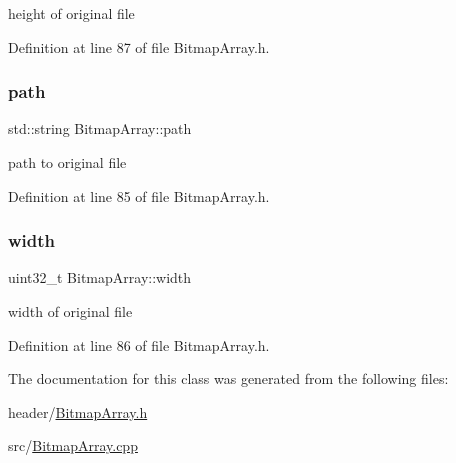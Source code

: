 height of original file 

Definition at line 87 of file Bitmap\+Array.\+h.

\mbox{\label{classBitmapArray_a3a3e1fbdd198c6731c7f6e20fb492445}} 
\subsubsection{\texorpdfstring{path}{path}}
{\footnotesize\ttfamily std\+::string Bitmap\+Array\+::path\hspace{0.3cm}{\ttfamily [private]}}

path to original file 

Definition at line 85 of file Bitmap\+Array.\+h.

\mbox{\label{classBitmapArray_a44f51b2c1ecde3f9aa504df25d65b6c9}} 
\subsubsection{\texorpdfstring{width}{width}}
{\footnotesize\ttfamily uint32\+\_\+t Bitmap\+Array\+::width\hspace{0.3cm}{\ttfamily [private]}}

width of original file 

Definition at line 86 of file Bitmap\+Array.\+h.



The documentation for this class was generated from the following files\+:\begin{DoxyCompactItemize}
\item 
header/\mbox{\hyperlink{BitmapArray_8h}{Bitmap\+Array.\+h}}\item 
src/\mbox{\hyperlink{BitmapArray_8cpp}{Bitmap\+Array.\+cpp}}\end{DoxyCompactItemize}

